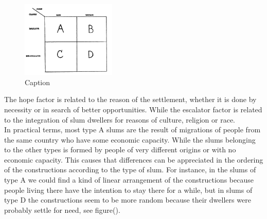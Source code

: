 \documentclass[10pt]{article}
\begin{document}
\begin{figure}[h]
    \centering
    \includegraphics[width=0.4\textwidth]{images/img}
    \caption{Caption}
    \label{fig:my_label}
\end{figure}

The hope factor is related to the reason of the settlement, whether it is done by necessity or in search of better opportunities. While the escalator factor is related to the integration of slum dwellers for reasons of culture, religion or race.\\

In practical terms, most type A slums are the result of migrations of people from the same country who have some economic capacity. While the slums belonging to the other types is formed by people of very different origins or with no economic capacity. This causes that differences can be appreciated in the ordering of the constructions according to the type of slum. For instance, in the slums of type A we could find a kind of linear arrangement of the constructions because people living there have the intention to stay there for a while, but in slums of type D the constructions seem to be more random because their dwellers were probably settle for need, see figure().\\ 
\end{document}
